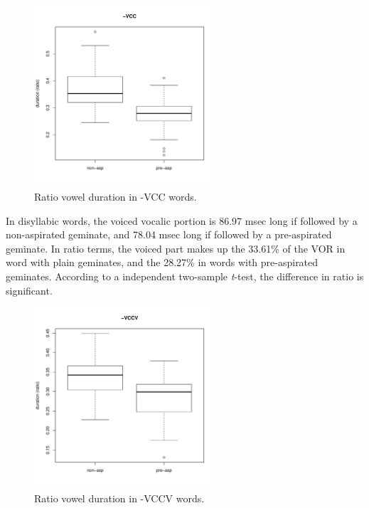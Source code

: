 \documentclass[11pt,a4paper,openany]{memoir}\usepackage[]{graphicx}\usepackage[]{color}
\newenvironment{knitrout}{}{} %
\begin{document}
\begin{figure}
\centering
\begin{knitrout}
\color{fgcolor}
\includegraphics[width=0.6\textwidth]{img/mono-stop-box-1} 

\end{knitrout}
\caption{Ratio vowel duration in -VCC words.}
\label{f:monostop}
\end{figure}



In disyllabic words, the voiced vocalic portion is 86.97 msec long if followed by a non-aspirated geminate, and 78.04 msec long if followed by a pre-aspirated geminate.
In ratio terms, the voiced part makes up the 33.61\% of the VOR in word with plain geminates, and the 28.27\% in words with pre-aspirated geminates.
According to a independent two-sample \textit{t}-test, the difference in ratio is significant.

\begin{figure}
\centering
\begin{knitrout}
\color{fgcolor}
\includegraphics[width=0.6\textwidth]{img/di-stop-box-1} 

\end{knitrout}
\caption{Ratio vowel duration in -VCCV words.}
\label{f:distop}
\end{figure}
\end{document}
